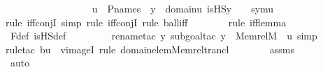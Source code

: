 \begin{isabellebody}
\ \ \ \ \ \ \isamarkupfalse%
\ \isanewline
\ \ \ \ \isamarkupfalse%
\ \isamarkupfalse%
\ {\isachardoublequoteopen}{\isachardot}{\kern0pt}{\isachardot}{\kern0pt}{\isachardot}{\kern0pt}\ {\isasymlongleftrightarrow}\ u\ {\isasymin}\ P{\isacharunderscore}{\kern0pt}names\ {\isasymand}\ {\isacharparenleft}{\kern0pt}{\isasymforall}y\ {\isasymin}\ domain{\isacharparenleft}{\kern0pt}u{\isacharparenright}{\kern0pt}{\isachardot}{\kern0pt}\ is{\isacharunderscore}{\kern0pt}HS{\isacharparenleft}{\kern0pt}y{\isacharparenright}{\kern0pt}\ {\isacharequal}{\kern0pt}\ {}{\isacharparenright}{\kern0pt}\ {\isasymand}\ sym{\isacharparenleft}{\kern0pt}u{\isacharparenright}{\kern0pt}\ {\isasymin}\ {\isasymF}{\isachardoublequoteclose}\ \isanewline
\ \ \ \ \ \ \isamarkupfalse%
{\isacharparenleft}{\kern0pt}rule\ iff{\isacharunderscore}{\kern0pt}conjI{\isacharcomma}{\kern0pt}\ simp{\isacharcomma}{\kern0pt}\ rule\ iff{\isacharunderscore}{\kern0pt}conjI{\isacharcomma}{\kern0pt}\ rule\ ball{\isacharunderscore}{\kern0pt}iff{\isacharparenright}{\kern0pt}\isanewline
\ \ \ \ \ \ \ \isamarkupfalse%
{\isacharparenleft}{\kern0pt}rule\ iff{\isacharunderscore}{\kern0pt}lemma{\isacharparenright}{\kern0pt}\isanewline
\ \ \ \ \ \ \isamarkupfalse%
\ F{\isacharunderscore}{\kern0pt}def\ is{\isacharunderscore}{\kern0pt}HS{\isacharunderscore}{\kern0pt}def\ \isanewline
\ \ \ \ \ \ \ \isamarkupfalse%
{\isacharparenleft}{\kern0pt}rename{\isacharunderscore}{\kern0pt}tac\ y{\isacharcomma}{\kern0pt}\ subgoal{\isacharunderscore}{\kern0pt}tac\ {\isachardoublequoteopen}y\ {\isasymin}\ Memrel{\isacharparenleft}{\kern0pt}M{\isacharparenright}{\kern0pt}{\isacharcircum}{\kern0pt}{\isacharplus}{\kern0pt}\ {\isacharminus}{\kern0pt}{\isacharbackquote}{\kern0pt}{\isacharbackquote}{\kern0pt}\ {\isacharbraceleft}{\kern0pt}u{\isacharbraceright}{\kern0pt}{\isachardoublequoteclose}{\isacharcomma}{\kern0pt}\ simp{\isacharparenright}{\kern0pt}\isanewline
\ \ \ \ \ \ \ \isamarkupfalse%
{\isacharparenleft}{\kern0pt}rule{\isacharunderscore}{\kern0pt}tac\ b{\isacharequal}{\kern0pt}u\ \ vimageI{\isacharcomma}{\kern0pt}\ rule\ domain{\isacharunderscore}{\kern0pt}elem{\isacharunderscore}{\kern0pt}Memrel{\isacharunderscore}{\kern0pt}trancl{\isacharparenright}{\kern0pt}\isanewline
\ \ \ \ \ \ \isamarkupfalse%
\ assms{}\ \isanewline
\ \ \ \ \ \ \isamarkupfalse%
\ auto\ \isanewline
\ \ \ \ \isamarkupfalse%

\end{isabellebody}
